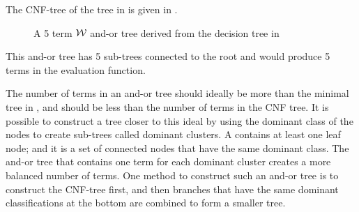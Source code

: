 \documentclass[twoside,11pt]{article}
\begin{document}
The CNF-tree of the tree in  is given in . 
\begin{figure}
\center
\tiny
{}
{
}
\caption{A 5 term ${\cal W}$ and-or tree derived from the decision tree in }
\label{fig:wintree_maximal}
\end{figure}
 This and-or tree has 5 sub-trees connected to the root and would produce 5 terms in the evaluation function. 
 
The number of terms in an and-or tree should ideally be more than the minimal tree in , and should be less than the number of terms in the CNF tree.  It is possible to construct a tree closer to this ideal by using the dominant class of the nodes to create sub-trees called dominant clusters.  A  contains at least one leaf node; and it is a set of connected nodes that have the same dominant class. The and-or tree that contains one term for each dominant cluster creates a more balanced number of terms. One method to construct such an and-or tree is to construct the CNF-tree first, and then branches that have the same dominant classifications at the bottom are combined to form a smaller tree.
\end{document}
